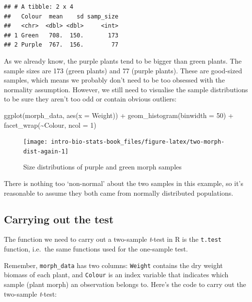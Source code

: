 \documentclass[
]{book}
\newenvironment{Shaded}{\begin{snugshade}}{\end{snugshade}}
\newcommand{\AttributeTok}[1]{\textcolor[rgb]{0.77,0.63,0.00}{#1}}
\newcommand{\DecValTok}[1]{\textcolor[rgb]{0.00,0.00,0.81}{#1}}
\newcommand{\FunctionTok}[1]{\textcolor[rgb]{0.00,0.00,0.00}{#1}}
\newcommand{\NormalTok}[1]{#1}
\newcommand{\SpecialCharTok}[1]{\textcolor[rgb]{0.00,0.00,0.00}{#1}}
\begin{document}
\begin{verbatim}
## # A tibble: 2 x 4
##   Colour  mean    sd samp_size
##   <chr>  <dbl> <dbl>     <int>
## 1 Green   708.  150.       173
## 2 Purple  767.  156.        77
\end{verbatim}

As we already know, the purple plants tend to be bigger than green plants. The sample sizes are 173 (green plants) and 77 (purple plants). These are good-sized samples, which means we probably don't need to be too obsessed with the normality assumption. However, we still need to visualise the sample distributions to be sure they aren't too odd or contain obvious outliers:

\begin{Shaded}
\begin{Highlighting}[]
\FunctionTok{ggplot}\NormalTok{(morph\_data, }\FunctionTok{aes}\NormalTok{(}\AttributeTok{x =}\NormalTok{ Weight)) }\SpecialCharTok{+} 
  \FunctionTok{geom\_histogram}\NormalTok{(}\AttributeTok{binwidth =} \DecValTok{50}\NormalTok{) }\SpecialCharTok{+} 
  \FunctionTok{facet\_wrap}\NormalTok{(}\SpecialCharTok{\textasciitilde{}}\NormalTok{Colour, }\AttributeTok{ncol =} \DecValTok{1}\NormalTok{)}
\end{Highlighting}
\end{Shaded}

\begin{figure}

{\centering \texttt{[image: intro-bio-stats-book\_files/figure-latex/two-morph-dist-again-1]} 

}

\caption{Size distributions of purple and green morph samples}\label{fig:two-morph-dist-again}
\end{figure}

There is nothing too `non-normal' about the two samples in this example, so it's reasonable to assume they both came from normally distributed populations.

\hypertarget{carrying-out-the-test-1}{%
\subsection{Carrying out the test}\label{carrying-out-the-test-1}}

The function we need to carry out a two-sample \emph{t}-test in R is the \texttt{t.test} function, i.e.~the same functions used for the one-sample test.

Remember, \texttt{morph\_data} has two columns: \texttt{Weight} contains the dry weight biomass of each plant, and \texttt{Colour} is an index variable that indicates which sample (plant morph) an observation belongs to. Here's the code to carry out the two-sample \emph{t}-test:
\end{document}
